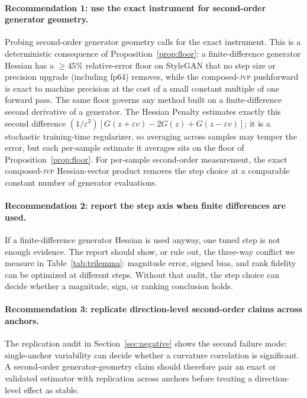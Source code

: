 \documentclass[10pt]{article}
\newcommand{\jvp}{\textsc{jvp}}
\newcommand{\eps}{\varepsilon}
\begin{document}
\paragraph{Recommendation 1: use the exact instrument for second-order generator geometry.}
Probing second-order generator geometry calls for the exact instrument.
This is a deterministic consequence of Proposition~\ref{prop:floor}: a
finite-difference generator Hessian has a $\geq45\%$ relative-error floor on StyleGAN that no
step size or precision upgrade (including fp64) removes, while the composed-\jvp{} pushforward is exact to machine
precision at the cost of a small constant multiple of one forward pass. The same floor governs any
method built on a finite-difference second derivative of a generator. The Hessian Penalty
\citep{peebles2020} estimates exactly this second difference
$(1/\eps^2)[G(z+\eps v)-2G(z)+G(z-\eps v)]$; it is a stochastic training-time regularizer, so
averaging across samples may temper the error, but each per-sample estimate it averages sits on the
floor of Proposition~\ref{prop:floor}. For per-sample second-order measurement, the exact
composed-\jvp{} Hessian-vector product removes the step choice at a comparable constant number of
generator evaluations.

\paragraph{Recommendation 2: report the step axis when finite differences are used.}
If a finite-difference generator Hessian is used anyway, one tuned step is not enough evidence.
The report should show, or rule out, the three-way conflict we measure in Table~\ref{tab:trilemma}:
magnitude error, signed bias, and rank fidelity can be optimized at different steps. Without that
audit, the step choice can decide whether a magnitude, sign, or ranking conclusion holds.

\paragraph{Recommendation 3: replicate direction-level second-order claims across anchors.}
The replication audit in Section~\ref{sec:negative} shows the second failure mode: single-anchor
variability can decide whether a curvature correlation is significant. A second-order
generator-geometry claim should therefore pair an exact or validated estimator with replication
across anchors before treating a direction-level effect as stable.
\end{document}
